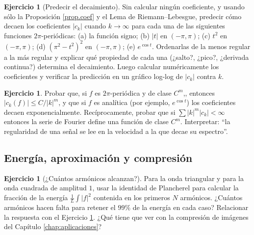 \documentclass[12pt, a4paper]{amsbook}
\theoremstyle{remark}
\theoremstyle{definition}
\newtheorem{ejer}[teo]{Ejercicio}
\numberwithin{section}{chapter}
\numberwithin{subsection}{section}
\numberwithin{equation}{section}
\numberwithin{figure}{chapter}
\begin{document}
\begin{ejer}[Predecir el decaimiento]\label{ejer:decaimiento}
Sin calcular ningún coeficiente, y usando sólo la Proposición \ref{prop.coef} y el Lema de Riemann--Lebesgue, predecir cómo decaen los coeficientes $|c_k|$ cuando $k\to\infty$ para cada una de las siguientes funciones $2\pi$-periódicas: (a) la función signo; (b) $|t|$ en $(-\pi,\pi)$; (c) $t^2$ en $(-\pi,\pi)$; (d) $(\pi^2-t^2)^2$ en $(-\pi,\pi)$; (e) $e^{\cos t}$. Ordenarlas de la menos regular a la más regular y explicar qué propiedad de cada una (¿salto?, ¿pico?, ¿derivada continua?) determina el decaimiento. Luego calcular numéricamente los coeficientes y verificar la predicción en un gráfico log-log de $|c_k|$ contra $k$.
\end{ejer}

\begin{ejer}
Probar que, si $f$ es $2\pi$-periódica y de clase $C^m$,, entonces $|c_k(f)|\le C/|k|^m$, y que si $f$ es analítica (por ejemplo, $e^{\cos t}$) los coeficientes decaen exponencialmente. Recíprocamente, probar que si $\sum |k|^m|c_k|<\infty$ entonces la serie de Fourier define una función de clase $C^m$. Interpretar: ``la regularidad de una señal se lee en la velocidad a la que decae su espectro''.
\end{ejer}

\subsection*{Energía, aproximación y compresión}

\begin{ejer}[¿Cuántos armónicos alcanzan?]
Para la onda triangular y para la onda cuadrada de amplitud $1$, usar la identidad de Plancherel para calcular la fracción de la energía $\frac1L\int|f|^2$ contenida en los primeros $N$ armónicos. ¿Cuántos armónicos hacen falta para retener el $99\%$ de la energía en cada caso? Relacionar la respuesta con el Ejercicio \ref{ejer:decaimiento}. ¿Qué tiene que ver con la compresión de imágenes del Capítulo \ref{chap:aplicaciones}?
\end{ejer}
\end{document}
